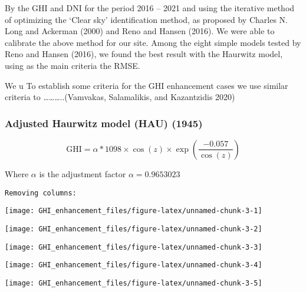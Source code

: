 \documentclass[
  11pt,
  a4paper,oneside]{article}
\begin{document}
By the GHI and DNI for the period 2016 -- 2021 and using the iterative
method of optimizing the `Clear sky' identification method, as proposed
by Charles N. Long and Ackerman (2000) and Reno and Hansen (2016). We were able to calibrate the above method
for our site. Among the eight simple models tested by Reno and Hansen (2016), we found
the best result with the Haurwitz model, using as the main criteria the
RMSE.

We u
To establish some criteria for the GHI enhancement cases we use similar
criteria to \ldots\ldots\ldots..(Vamvakas, Salamalikis, and Kazantzidis 2020)

\hypertarget{adjusted-haurwitz-model-hau-1945}{%
\subsubsection{Adjusted Haurwitz model (HAU) (1945)}\label{adjusted-haurwitz-model-hau-1945}}

\[ \text{GHI} = \alpha * 1098 \times \cos( z ) \times \exp \left( \frac{ - 0.057}{\cos(z)} \right) \]

Where \(\alpha\) is the adjustment factor \(\alpha = 0.9653023\)

\begin{verbatim}
Removing columns:  
\end{verbatim}

\begin{center}\texttt{[image: GHI\_enhancement\_files/figure-latex/unnamed-chunk-3-1]} \end{center}

\begin{center}\texttt{[image: GHI\_enhancement\_files/figure-latex/unnamed-chunk-3-2]} \end{center}

\begin{center}\texttt{[image: GHI\_enhancement\_files/figure-latex/unnamed-chunk-3-3]} \end{center}

\begin{center}\texttt{[image: GHI\_enhancement\_files/figure-latex/unnamed-chunk-3-4]} \end{center}

\begin{center}\texttt{[image: GHI\_enhancement\_files/figure-latex/unnamed-chunk-3-5]} \end{center}
\end{document}
